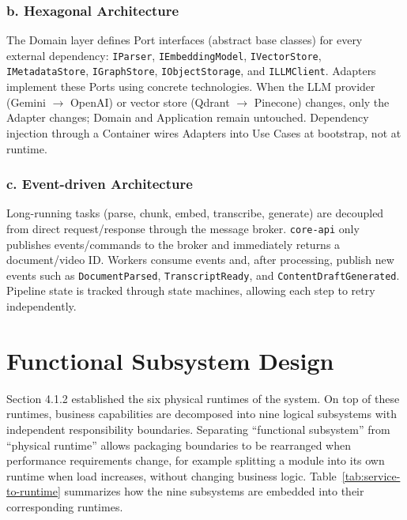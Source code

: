 \subsubsection*{b. Hexagonal Architecture}

The Domain layer defines Port interfaces (abstract base classes) for
every external dependency: \texttt{IParser}, \texttt{IEmbeddingModel},
\texttt{IVectorStore}, \texttt{IMetadataStore}, \texttt{IGraphStore},
\texttt{IObjectStorage}, and \texttt{ILLMClient}. Adapters implement
these Ports using concrete technologies. When the LLM provider (Gemini
$\to$ OpenAI) or vector store (Qdrant $\to$ Pinecone) changes, only the
Adapter changes; Domain and Application remain untouched. Dependency
injection through a Container wires Adapters into Use Cases at bootstrap,
not at runtime.

\subsubsection*{c. Event-driven Architecture}

Long-running tasks (parse, chunk, embed, transcribe, generate) are
decoupled from direct request/response through the message broker.
\texttt{core-api} only publishes events/commands to the broker and
immediately returns a document/video ID. Workers consume events and, after
processing, publish new events such as \texttt{DocumentParsed},
\texttt{TranscriptReady}, and \texttt{ContentDraftGenerated}. Pipeline
state is tracked through state machines, allowing each step to retry
independently.

\section{Functional Subsystem Design}

Section 4.1.2 established the six physical runtimes of the system. On top
of these runtimes, business capabilities are decomposed into nine logical
subsystems with independent responsibility boundaries. Separating
``functional subsystem'' from ``physical runtime'' allows packaging
boundaries to be rearranged when performance requirements change, for
example splitting a module into its own runtime when load increases,
without changing business logic. Table~\ref{tab:service-to-runtime}
summarizes how the nine subsystems are embedded into their corresponding
runtimes.

